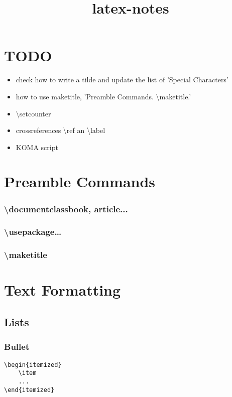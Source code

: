 \documentclass{report}
\title{latex-notes}
\begin{document}
\tableofcontents


\part{TODO}
\begin{itemize}
	\item check how to write a tilde and update the list of 'Special Characters'
	\item how to use maketitle, 'Preamble Commands. \textbackslash maketitle.'
	\item \textbackslash setcounter
	\item crossreferences \textbackslash ref an \textbackslash label
	\item KOMA script
\end{itemize}

\part{Preamble Commands}
\section{\textbackslash documentclass{book, article...}}
\section{\textbackslash usepackage{…}}
\section{\textbackslash maketitle}




\part{Text Formatting}



\chapter{Lists}


\section{Bullet}
\begin{verbatim}
\begin{itemized}
    \item 
    ...
\end{itemized}
\end{verbatim}
\end{document}
